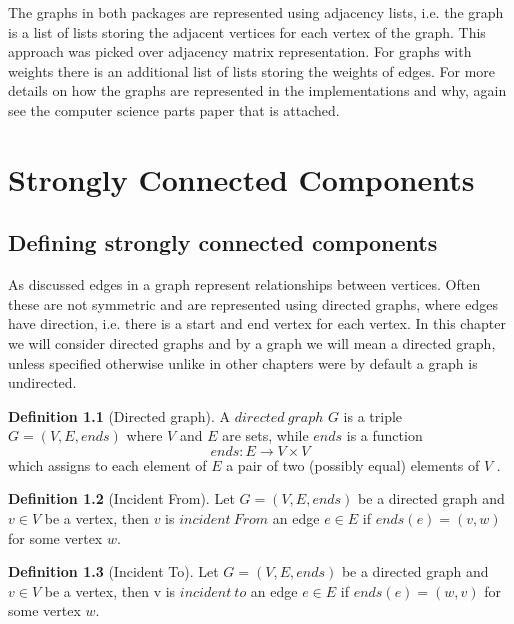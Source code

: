 \documentclass{report}
\theoremstyle{plain}
\theoremstyle{definition}
\newtheorem{definition}{Definition}
\theoremstyle{remark}
\numberwithin{definition}{chapter}
\numberwithin{example}{chapter}
\numberwithin{figure}{chapter}
\numberwithin{theorem}{chapter}
\numberwithin{lemma}{chapter}
\begin{document}
The graphs in both packages are represented using adjacency lists, i.e. the graph is a list of lists storing the adjacent vertices for each vertex of the graph. This approach was picked over adjacency matrix representation. For graphs with weights there is an additional list of lists storing the weights of edges. For more details on how the graphs are represented in the implementations and why, again see the computer science parts paper that is attached.

\chapter{Strongly Connected Components}

\section{Defining strongly connected components}

As discussed edges in a graph represent relationships between vertices. Often these are not symmetric and are represented using directed graphs, where edges have direction, i.e. there is a start and end vertex for each vertex. In this chapter we will consider directed graphs and by a graph we will mean a directed graph, unless specified otherwise unlike in other chapters were by default a graph is undirected.

\begin{definition}[Directed graph]
A $directed \ graph$  $G$ is a triple $G = (V, E, ends)$ where $V$ and $E$ are sets, while $ends$ is a function 
  \begin{equation}
  ends:E\to V \times V
  \end{equation}
which assigns to each element of $E$ a pair of two (possibly equal) elements of $V$ .
\end{definition}

\begin{definition}[Incident From]
Let $G = (V, E, ends)$ be a directed graph and $v \in V$ be a vertex, then $v$ is $incident \ From$ an edge $e \in E$ if $ends(e)=(v, w)$ for some vertex $w$.
\end{definition}

\begin{definition}[Incident To]
Let $G = (V, E, ends)$ be a directed graph and $v \in V$ be a vertex, then v is $incident \ to$ an edge $e \in E$ if $ends(e)=(w, v)$ for some vertex $w$.
\end{definition}
\end{document}
